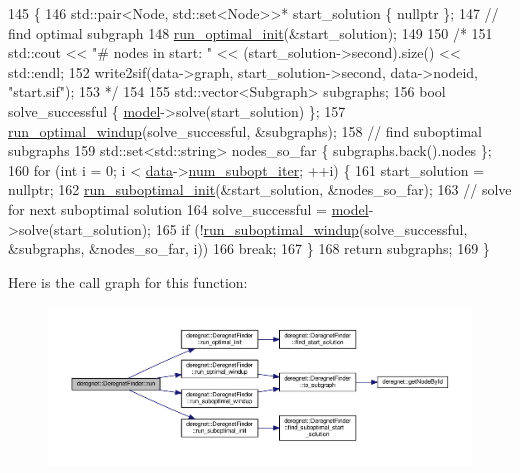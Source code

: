 \begin{DoxyCode}
145                                                          \{
146     std::pair<Node, std::set<Node>>* start\_solution \{ \textcolor{keyword}{nullptr} \};
147     \textcolor{comment}{// find optimal subgraph}
148     \hyperlink{classderegnet_1_1DeregnetFinder_ae0335349d6a60ee204d10bf8b7366cfa}{run\_optimal\_init}(&start\_solution);
149 
150     \textcolor{comment}{/*}
151 \textcolor{comment}{    std::cout << "# nodes in start: " << (start\_solution->second).size() << std::endl;}
152 \textcolor{comment}{    write2sif(data->graph, start\_solution->second, data->nodeid, "start.sif");}
153 \textcolor{comment}{    */}
154 
155     std::vector<Subgraph> subgraphs;
156     \textcolor{keywordtype}{bool} solve\_successful \{ \hyperlink{classderegnet_1_1DeregnetFinder_ad922d8e38124b4c75daac29a928fcf5b}{model}->solve(start\_solution) \};
157     \hyperlink{classderegnet_1_1DeregnetFinder_a92610c1444ba271820e64d224ec64bb7}{run\_optimal\_windup}(solve\_successful, &subgraphs);
158     \textcolor{comment}{// find suboptimal subgraphs}
159     std::set<std::string> nodes\_so\_far \{ subgraphs.back().nodes \};
160     \textcolor{keywordflow}{for} (\textcolor{keywordtype}{int} i = 0; i < \hyperlink{classderegnet_1_1DeregnetFinder_ab158f2a6bb7f39ed3d6e4a9ffe568232}{data}->\hyperlink{classderegnet_1_1DeregnetData_adb7428cd99112156ae9f80187af9ebbe}{num\_subopt\_iter}; ++i) \{
161         start\_solution = \textcolor{keyword}{nullptr};
162         \hyperlink{classderegnet_1_1DeregnetFinder_ad996cee997a5db4e09016a6f725a6701}{run\_suboptimal\_init}(&start\_solution, &nodes\_so\_far);
163         \textcolor{comment}{// solve for next suboptimal solution}
164         solve\_successful = \hyperlink{classderegnet_1_1DeregnetFinder_ad922d8e38124b4c75daac29a928fcf5b}{model}->solve(start\_solution);
165         \textcolor{keywordflow}{if} (!\hyperlink{classderegnet_1_1DeregnetFinder_a4021d92d787877187a24dcbaf0c1bad1}{run\_suboptimal\_windup}(solve\_successful, &subgraphs, &nodes\_so\_far, i))
166             \textcolor{keywordflow}{break};
167     \}
168     \textcolor{keywordflow}{return} subgraphs;
169 \}
\end{DoxyCode}


Here is the call graph for this function\+:
\nopagebreak
\begin{figure}[H]
\begin{center}
\leavevmode
\includegraphics[width=350pt]{classderegnet_1_1DeregnetFinder_a1a6119b306b54ff44d8c78f34fc037ab_cgraph}
\end{center}
\end{figure}




